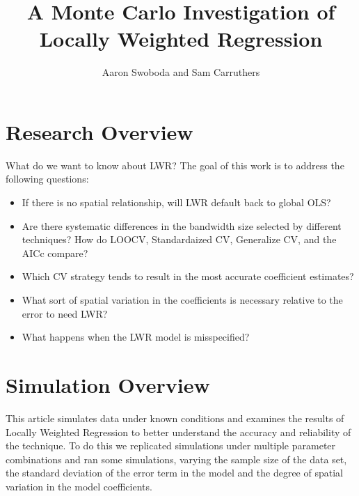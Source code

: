 \documentclass{article}\usepackage{graphicx, color}
\title{A Monte Carlo Investigation of Locally Weighted Regression}
\author{Aaron Swoboda and Sam Carruthers}
\begin{document}
\maketitle




\section{Research Overview}

What do we want to know about LWR? The goal of this work is to address the following questions:
\begin{itemize}
  \item If there is no spatial relationship, will LWR default back to global OLS?
  \item Are there systematic differences in the bandwidth size selected by different techniques? How do LOOCV, Standardaized CV, Generalize CV, and the AICc compare?
  \item Which CV strategy tends to result in the most accurate coefficient estimates?
  \item What sort of spatial variation in the coefficients is necessary relative to the error to need LWR?
  \item What happens when the LWR model is misspecified?
\end{itemize}

\section{Simulation Overview}


This article simulates data under known conditions and examines the results of Locally Weighted Regression to better understand the accuracy and reliability of the technique. To do this we replicated simulations under multiple parameter combinations and ran some simulations, varying the sample size of the data set, the standard deviation of the error term in the model and the degree of spatial variation in the model coefficients. 
\end{document}
